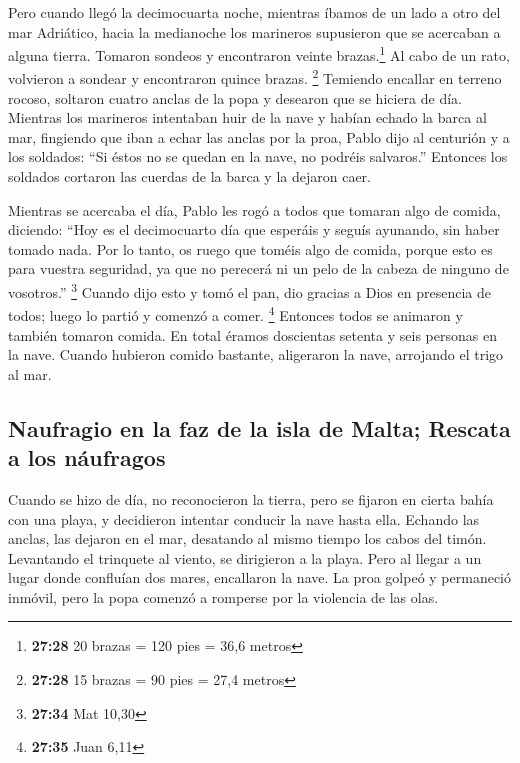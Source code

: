\begin{paracol}{2}
 Pero cuando llegó la decimocuarta noche, mientras íbamos
de un lado a otro del mar Adriático, hacia la medianoche los marineros
supusieron que se acercaban a alguna tierra.  Tomaron
sondeos y encontraron veinte brazas.\footnote{\textbf{27:28} 20 brazas =
  120 pies = 36,6 metros} Al cabo de un rato, volvieron a sondear y
encontraron quince brazas. \footnote{\textbf{27:28} 15 brazas = 90 pies
  = 27,4 metros}  Temiendo encallar en terreno rocoso,
soltaron cuatro anclas de la popa y desearon que se hiciera de día.
 Mientras los marineros intentaban huir de la nave y
habían echado la barca al mar, fingiendo que iban a echar las anclas por
la proa,  Pablo dijo al centurión y a los soldados: ``Si
éstos no se quedan en la nave, no podréis salvaros.'' 
Entonces los soldados cortaron las cuerdas de la barca y la dejaron
caer.

 Mientras se acercaba el día, Pablo les rogó a todos que
tomaran algo de comida, diciendo: ``Hoy es el decimocuarto día que
esperáis y seguís ayunando, sin haber tomado nada.  Por
lo tanto, os ruego que toméis algo de comida, porque esto es para
vuestra seguridad, ya que no perecerá ni un pelo de la cabeza de ninguno
de vosotros.'' \footnote{\textbf{27:34} Mat 10,30} 
Cuando dijo esto y tomó el pan, dio gracias a Dios en presencia de
todos; luego lo partió y comenzó a comer. \footnote{\textbf{27:35} Juan
  6,11}  Entonces todos se animaron y también tomaron
comida.  En total éramos doscientas setenta y seis
personas en la nave.  Cuando hubieron comido bastante,
aligeraron la nave, arrojando el trigo al mar.

\hypertarget{naufragio-en-la-faz-de-la-isla-de-malta-rescata-a-los-nuxe1ufragos}{%
\subsection{Naufragio en la faz de la isla de Malta; Rescata a los
náufragos}\label{naufragio-en-la-faz-de-la-isla-de-malta-rescata-a-los-nuxe1ufragos}}

 Cuando se hizo de día, no reconocieron la tierra, pero
se fijaron en cierta bahía con una playa, y decidieron intentar conducir
la nave hasta ella.  Echando las anclas, las dejaron en
el mar, desatando al mismo tiempo los cabos del timón. Levantando el
trinquete al viento, se dirigieron a la playa.  Pero al
llegar a un lugar donde confluían dos mares, encallaron la nave. La proa
golpeó y permaneció inmóvil, pero la popa comenzó a romperse por la
violencia de las olas.


\end{paracol}
